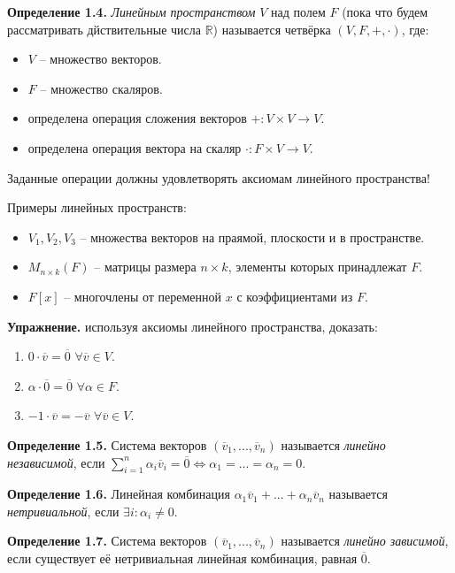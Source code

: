 \documentclass[a4paper, 12pt]{article}
\begin{document}
\begin{spacing}{1.5}
\textbf{Определение 1.4.} \textit{Линейным пространством} $V$ над полем $F$ (пока что будем рассматривать дйствительные числа $\mathbb{R}$) называется четвёрка $(V, F, +, \cdot)$, где:
\begin{itemize}[noitemsep]
    \item $V$ -- множество векторов.
    \item $F$ -- множество скаляров.
    \item определена операция сложения векторов $+: V \times V \rightarrow V$.
    \item определена операция вектора на скаляр $\cdot: F \times V \rightarrow V$.
\end{itemize}
Заданные операции должны удовлетворять аксиомам линейного пространства!

\newpage

Примеры линейных пространств:
\begin{itemize}[noitemsep]
    \item $V_1, V_2, V_3$ -- множества векторов на праямой, плоскости и в пространстве.
    \item $M_{n \times k}(F)$ -- матрицы размера $n \times k$, элементы которых принадлежат $F$.
    \item $F[x]$ -- многочлены от переменной $x$ с коэффициентами из $F$.
\end{itemize}

\textbf{Упражнение.} используя аксиомы линейного пространства, доказать:
\begin{enumerate}[noitemsep, label=\alph*)]
    \item $0 \cdot \overline{v} = \overline{0}$ $\forall \overline{v} \in V$.
    \item $\alpha \cdot \overline{0} = \overline{0}$ $\forall \alpha \in F$.
    \item $-1 \cdot \overline{v} = - \overline{v}$ $\forall \overline{v} \in V$.
\end{enumerate}

\textbf{Определение 1.5.} Система векторов $(\overline{v}_1, ..., \overline{v}_n)$ называется \textit{линейно независимой}, если $\sum_{i=1}^n \alpha_i \overline{v}_i = \overline{0} \Leftrightarrow \alpha_1 = ... = \alpha_n = 0$.

\textbf{Определение 1.6.} Линейная комбинация $\alpha_1 \overline{v}_1 + ... + \alpha_n \overline{v}_n$ называется \textit{нетривиальной}, если $\exists i : \alpha_i \neq 0$.

\textbf{Определение 1.7.} Система векторов $(\overline{v}_1, ..., \overline{v}_n)$ называется \textit{линейно зависимой}, если существует её нетривиальная линейная комбинация, равная $\overline{0}$.


\end{spacing}
\end{document}
